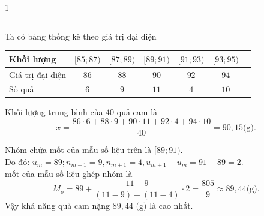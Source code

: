 \begin{ex}
{\begin{enumEX}{1}
\begin{center}
\begin{tabular}{|l|c|c|c|c|c|c|}
					 \hline
				\end{tabular}
			\end{center}
			\item Ta có bảng thống kê theo giá trị đại  diện
			\begin{center}
				\begin{tabular}{|l|c|c|c|c|c|c|}
					\hline Khối lượng & {$[85;87)$} & {$ [87;89)$} & {$[89;91) $} & {$[91;93)$}&  {$[93;95)$}\\
					\hline Giá trị đại  diện & $86$ & $88$ & $90$ & $92$& $94$\\
					\hline Số quả & $6$ & $9$  & $11$ & $4$& $10$\\
					 \hline
				\end{tabular}
			\end{center}
			Khối lượng trung bình của $40$ quả cam  là $$\overline{x}=\dfrac{86\cdot 6+88\cdot 9+90\cdot 11+92\cdot 4+94\cdot 10}{40}=90{,}15\text{(g)}.$$
			 \item Nhóm chứa mốt của mẫu số liệu trên là $[89;91)$.\\
			Do đó:  $u_m=89;n_{m-1}=9,n_{m+1}=4,u_{m+1}-u_m=91-89=2$.\\
			mốt của mẫu số  liệu ghép nhóm là $$ M_o=89+\dfrac{11-9}{(11-9)+(11-4)}\cdot 2=\dfrac{805}{9}\approx 89{,}44\text{(g)}.$$
			Vậy khả năng quả cam nặng $89{,}44\text{ (g)}$ là cao  nhất.
		\end{enumEX}
	 }
\end{ex}

